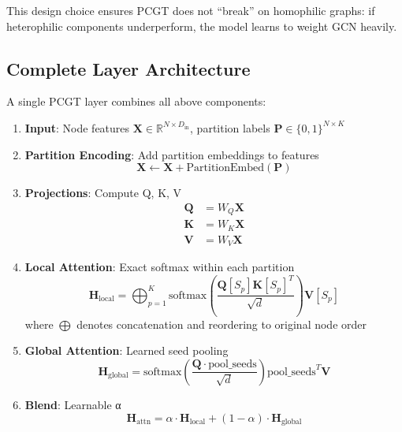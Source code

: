 \documentclass[11pt, a4paper]{article}
\begin{document}
This design choice ensures PCGT does not ``break'' on homophilic graphs: if heterophilic components underperform, the model learns to weight GCN heavily.

\subsection{Complete Layer Architecture}

A single PCGT layer combines all above components:

\begin{enumerate}
    \item \textbf{Input}: Node features $\mathbf{X} \in \mathbb{R}^{N \times D_{\text{in}}}$, partition labels $\mathbf{P} \in \{0,1\}^{N \times K}$
    
    \item \textbf{Partition Encoding}: Add partition embeddings to features
    \begin{equation}
    \mathbf{X} \leftarrow \mathbf{X} + \text{PartitionEmbed}(\mathbf{P})
    \end{equation}
    
    \item \textbf{Projections}: Compute Q, K, V
    \begin{align}
    \mathbf{Q} &= W_Q \mathbf{X} \\
    \mathbf{K} &= W_K \mathbf{X} \\
    \mathbf{V} &= W_V \mathbf{X}
    \end{align}
    
    \item \textbf{Local Attention}: Exact softmax within each partition
    \begin{equation}
    \mathbf{H}_{\text{local}} = \bigoplus_{p=1}^{K} \text{softmax}\left( \frac{\mathbf{Q}[S_p] \mathbf{K}[S_p]^T}{\sqrt{d}} \right) \mathbf{V}[S_p]
    \end{equation}
    where $\bigoplus$ denotes concatenation and reordering to original node order
    
    \item \textbf{Global Attention}: Learned seed pooling
    \begin{equation}
    \mathbf{H}_{\text{global}} = \text{softmax}\left( \frac{\mathbf{Q} \cdot \text{pool\_seeds}}{\sqrt{d}} \right) \text{pool\_seeds}^T \mathbf{V}
    \end{equation}
    
    \item \textbf{Blend}: Learnable α
    \begin{equation}
    \mathbf{H}_{\text{attn}} = \alpha \cdot \mathbf{H}_{\text{local}} + (1 - \alpha) \cdot \mathbf{H}_{\text{global}}
    \end{equation}
    

\end{enumerate}
\end{document}
